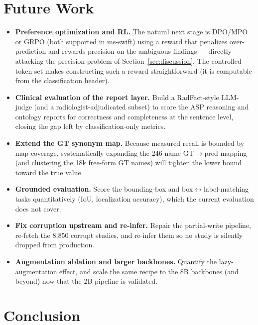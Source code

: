 \documentclass[11pt,a4paper]{article}
\begin{document}
\section{Future Work}
\label{sec:future}

\begin{itemize}[leftmargin=1.4em]
  \item \textbf{Preference optimization and RL.} The natural next stage is DPO/MPO or GRPO (both supported in ms-swift) using a reward that penalizes over-prediction and rewards precision on the ambiguous findings --- directly attacking the precision problem of Section~\ref{sec:discussion}. The controlled token set makes constructing such a reward straightforward (it is computable from the classification header).
  \item \textbf{Clinical evaluation of the report layer.} Build a RadFact-style LLM-judge (and a radiologist-adjudicated subset) to score the ASP reasoning and ontology reports for correctness and completeness at the sentence level, closing the gap left by classification-only metrics.
  \item \textbf{Extend the GT synonym map.} Because measured recall is bounded by map coverage, systematically expanding the 246-name GT$\rightarrow$pred mapping (and clustering the 18k free-form GT names) will tighten the lower bound toward the true value.
  \item \textbf{Grounded evaluation.} Score the bounding-box and box$\leftrightarrow$label-matching tasks quantitatively (IoU, localization accuracy), which the current evaluation does not cover.
  \item \textbf{Fix corruption upstream and re-infer.} Repair the partial-write pipeline, re-fetch the 8{,}850 corrupt studies, and re-infer them so no study is silently dropped from production.
  \item \textbf{Augmentation ablation and larger backbones.} Quantify the lazy-augmentation effect, and scale the same recipe to the 8B backbones (and beyond) now that the 2B pipeline is validated.
\end{itemize}

\section{Conclusion}
\label{sec:conclusion}
\end{document}

